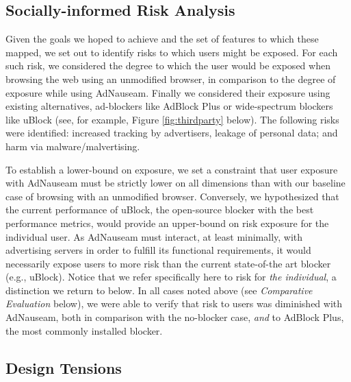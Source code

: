 \documentclass[conference]{IEEEtran}
\begin{document}
\subsection{Socially-informed Risk Analysis}

Given the goals we hoped to achieve and the set of features to which these mapped, we set out to identify risks to which users might be exposed. For each such risk, we considered the degree to which the user would be exposed when browsing the web using an unmodified browser, in comparison to the degree of exposure while using AdNauseam. Finally we considered their exposure using existing alternatives, ad-blockers like AdBlock Plus \cite{AdBlock} or wide-spectrum blockers like uBlock \cite{Gorhill}(see, for example, Figure \ref{fig:thirdparty} below). The following risks were identified: increased tracking by advertisers, leakage of personal data; and harm via malware/malvertising.


To establish a lower-bound on exposure, we set a constraint that user exposure with AdNauseam must be strictly lower on all dimensions than with our baseline case of browsing with an unmodified browser. Conversely, we hypothesized that the current performance of uBlock, the open-source blocker with the best performance metrics, would provide an upper-bound on risk exposure for the individual user. As AdNauseam must interact, at least minimally, with advertising servers in order to fulfill its functional requirements, it would necessarily expose users to more risk than the current state-of-the art blocker (e.g., uBlock). Notice that we refer specifically here to risk for \emph{the individual}, a distinction we return to below. In all cases noted above (see \emph{Comparative Evaluation} below), we were able to verify that risk to users was diminished with AdNauseam, both in comparison with the no-blocker case, \emph{and} to AdBlock Plus, the most commonly installed blocker\cite{PageFair}.


\subsection{Design Tensions}
\end{document}
